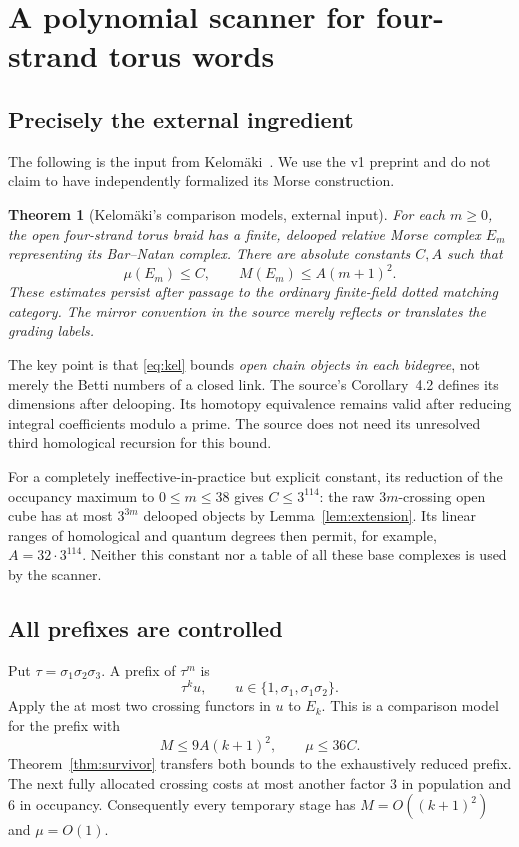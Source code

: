 \documentclass[11pt,letterpaper]{article}
\newtheorem{theorem}{Theorem}[section]
\theoremstyle{remark}\newtheorem{remark}[theorem]{Remark}
\begin{document}
\section{A polynomial scanner for four-strand torus words}\label{sec:torus}
\subsection{Precisely the external ingredient}
The following is the input from Kelom\"aki~\cite[Proposition~3.6 and Corollary~4.2]{Kel25}. We use the v1 preprint and do not claim to have independently formalized its Morse construction.

\begin{theorem}[Kelom\"aki's comparison models, external input]\label{thm:kel}
For each $m\ge0$, the open four-strand torus braid has a finite, delooped relative Morse complex $E_m$ representing its Bar--Natan complex. There are absolute constants $C,A$ such that
\begin{equation}\label{eq:kel}
 \mu(E_m)\le C,\qquad M(E_m)\le A(m+1)^2.
\end{equation}
These estimates persist after passage to the ordinary finite-field dotted matching category. The mirror convention in the source merely reflects or translates the grading labels.
\end{theorem}

The key point is that \eqref{eq:kel} bounds \emph{open chain objects in each bidegree}, not merely the Betti numbers of a closed link. The source's Corollary~4.2 defines its dimensions after delooping. Its homotopy equivalence remains valid after reducing integral coefficients modulo a prime. The source does not need its unresolved third homological recursion for this bound.

For a completely ineffective-in-practice but explicit constant, its reduction of the occupancy maximum to $0\le m\le38$ gives $C\le3^{114}$: the raw $3m$-crossing open cube has at most $3^{3m}$ delooped objects by Lemma~\ref{lem:extension}. Its linear ranges of homological and quantum degrees then permit, for example, $A=32\cdot3^{114}$. Neither this constant nor a table of all these base complexes is used by the scanner.

\subsection{All prefixes are controlled}
Put $\tau=\sigma_1\sigma_2\sigma_3$. A prefix of $\tau^m$ is
\[
 \tau^k u,\qquad u\in\{1,\sigma_1,\sigma_1\sigma_2\}.
\]
Apply the at most two crossing functors in $u$ to $E_k$. This is a comparison model for the prefix with
\[
 M\le9A(k+1)^2,\qquad \mu\le36C.
\]
Theorem~\ref{thm:survivor} transfers both bounds to the exhaustively reduced prefix. The next fully allocated crossing costs at most another factor $3$ in population and $6$ in occupancy. Consequently every temporary stage has $M=O((k+1)^2)$ and $\mu=O(1)$.
\end{document}
